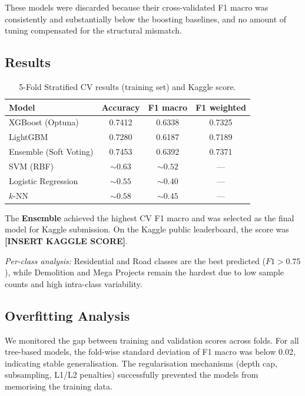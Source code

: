 \documentclass[11pt,a4paper]{article}
\begin{document}
These models were discarded because their cross-validated F1 macro was consistently and substantially below the boosting baselines, and no amount of tuning compensated for the structural mismatch.

\subsection{Results}

\begin{table}[h!]
\centering
\caption{5-Fold Stratified CV results (training set) and Kaggle score.}
\vspace{2pt}
\begin{tabular}{lccc}
\toprule
\textbf{Model} & \textbf{Accuracy} & \textbf{F1 macro} & \textbf{F1 weighted} \\
\midrule
XGBoost (Optuna)       & 0.7412 & 0.6338 & 0.7325 \\
LightGBM               & 0.7280 & 0.6187 & 0.7189 \\
Ensemble (Soft Voting)  & 0.7453 & 0.6392 & 0.7371 \\
\midrule
SVM (RBF)              & ${\sim}0.63$ & ${\sim}0.52$ & --- \\
Logistic Regression    & ${\sim}0.55$ & ${\sim}0.40$ & --- \\
$k$-NN                 & ${\sim}0.58$ & ${\sim}0.45$ & --- \\
\bottomrule
\end{tabular}
\label{tab:results}
\end{table}

The \textbf{Ensemble} achieved the highest CV F1 macro and was selected as the final model for Kaggle submission. On the Kaggle public leaderboard, the score was \textbf{[INSERT KAGGLE SCORE]}.

\textit{Per-class analysis:} Residential and Road classes are the best predicted ($F1 > 0.75$), while Demolition and Mega Projects remain the hardest due to low sample counts and high intra-class variability.

\subsection{Overfitting Analysis}
We monitored the gap between training and validation scores across folds. For all tree-based models, the fold-wise standard deviation of F1 macro was below 0.02, indicating stable generalisation. The regularisation mechanisms (depth cap, subsampling, L1/L2 penalties) successfully prevented the models from memorising the training data.
\end{document}
